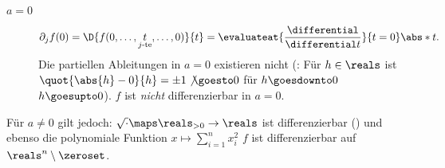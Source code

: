 \begin{beispiele}
\begin{enumerate}
\begin{description}
            \item[\( a=0 \)]
            \begin{align*}
                \partial_j f(0)=\D{f(0,\dotsc,\underset{j\text{-te}}{t},\dotsc,0)}{t}
                =\evaluateat{\frac{\differential}{\differential t}}{t=0}\abs*{t}.
            \end{align*} 
            \timplies Die partiellen Ableitungen in \( a=0 \) existieren nicht (: Für \( h\in \reals \) ist \( \quot{\abs{h}-0}{h}=\pm 1\not\goesto 0 \) für \( h\goesdownto 0 \) \bzw \( h\goesupto 0 \)). \timplies \( f \) ist \emph{nicht} differenzierbar in \( a=0 \).
        \end{description}
        Für \( a\neq 0 \) gilt jedoch: \( \sqrt{\cdot}\maps \reals_{>0} \to \reals \) ist differenzierbar () und ebenso die polynomiale Funktion \( x\mapsto \sum_{i=1}^{n}x_i^2 \) \timplies \( f \) ist differenzierbar auf \( \reals^n\setminus \zeroset\).


\end{enumerate}
\end{beispiele}
